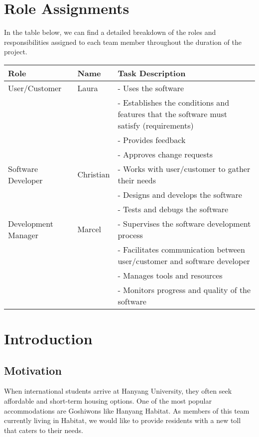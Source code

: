 \documentclass[conference]{IEEEtran}
\begin{document}
\section*{Role Assignments}
In the table below, we can find a detailed breakdown of the roles and responsibilities assigned to each team member throughout the duration of the project.
\begin{table}[htbp]
\centering
\begin{tabular}{|p{1.6cm}|l|p{3.6cm}|}
\hline
\textbf{Role} & \textbf{Name} & \textbf{Task Description}\\
\hline
User/Customer & Laura & 
- Uses the software \\
& & 
- Establishes the conditions and features that the software must satisfy (requirements) \\
& & 
- Provides feedback \\
& & 
- Approves change requests\\
\hline
Software Developer & Christian & 
- Works with user/customer to gather their needs \\
& & 
- Designs and develops the software \\
& & 
- Tests and debugs the software\\
\hline
Development Manager & Marcel & 
- Supervises the software development process \\
& & 
- Facilitates communication between user/customer and software developer \\
& & 
- Manages tools and resources \\
& & 
- Monitors progress and quality of the software\\
\hline
\end{tabular}
\end{table}


\section{Introduction}
\subsection{Motivation}
When international students arrive at Hanyang University, they often seek affordable and short-term housing options. One of the most popular accommodations are Goshiwons like Hanyang Habitat. As members of this team currently living in Habitat, we would like to provide residents with a new toll that caters to their needs.
\end{document}
